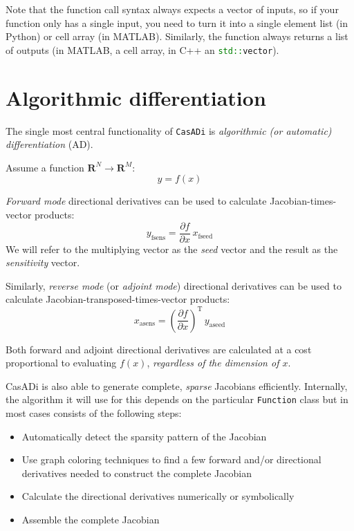 \documentclass[a4paper,12pt]{book}
\newcommand{\CasADi}{\texttt{CasADi}\xspace}
\begin{document}
Note that the function call syntax always expects a vector of inputs, so if your function only has a single input, you need to turn it into a single element list (in Python) or cell array (in MATLAB). Similarly, the function always returns a list of outputs (in MATLAB, a cell array, in C++ an \lstinline[language=C++]{std::vector}).

\section{Algorithmic differentiation}

The single most central functionality of \CasADi is \emph{algorithmic (or automatic) differentiation} (AD).

Assume a function $\mathbf{R}^N \rightarrow \mathbf{R}^M$:
\begin{equation}
 y = f(x)
\end{equation}

\emph{Forward mode} directional derivatives can be used to calculate Jacobian-times-vector products:
\begin{equation}
 y_{\text{fsens}} = \frac{\partial f}{\partial x} \, x_{\text{fseed}}
\end{equation}
We will refer to the multiplying vector as the \emph{seed} vector and the result as the \emph{sensitivity} vector.

Similarly, \emph{reverse mode} (or \emph{adjoint mode}) directional derivatives can be used to calculate Jacobian-transposed-times-vector products:
\begin{equation}
 x_{\text{asens}} = \left(\frac{\partial f}{\partial x}\right)^{\text{T}} \, y_{\text{aseed}}
\end{equation}

Both forward and adjoint directional derivatives are calculated at a cost proportional to evaluating $f(x)$, \emph{regardless of the dimension of $x$}.

CasADi is also able to generate complete, \emph{sparse} Jacobians efficiently. Internally, the algorithm it will use for this depends on the particular \texttt{Function} class but in most cases consists of the following steps:
\begin{itemize}
 \item Automatically detect the sparsity pattern of the Jacobian
 \item Use graph coloring techniques to find a few forward and/or directional derivatives needed to construct the complete Jacobian
 \item Calculate the directional derivatives numerically or symbolically
 \item Assemble the complete Jacobian
\end{itemize}
\end{document}
